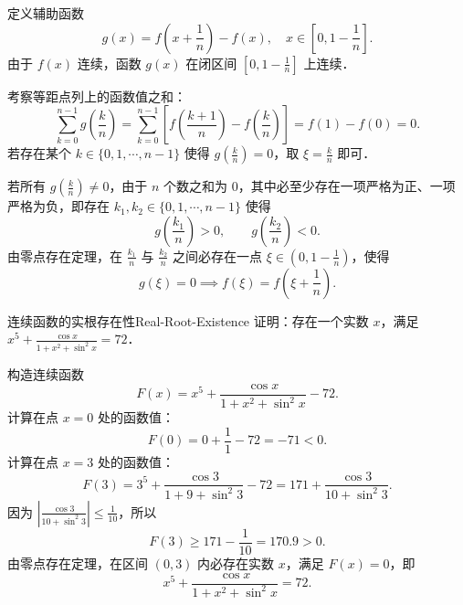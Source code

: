\begin{myproof}
    定义辅助函数
    \begin{equation}
        g(x) = f\left( x + \frac{1}{n} \right) - f(x), \quad x \in \left[ 0, 1 - \frac{1}{n} \right].
    \end{equation}
    由于 $f(x)$ 连续，函数 $g(x)$ 在闭区间 $\left[ 0, 1 - \frac{1}{n} \right]$ 上连续．

    考察等距点列上的函数值之和：
    \begin{equation}
        \sum_{k=0}^{n-1} g\left( \frac{k}{n} \right) = \sum_{k=0}^{n-1} \left[ f\left( \frac{k+1}{n} \right) - f\left( \frac{k}{n} \right) \right] = f(1) - f(0) = 0.
    \end{equation}
    若存在某个 $k \in \{0, 1, \cdots, n-1\}$ 使得 $g\left(\frac{k}{n}\right) = 0$，取 $\xi = \frac{k}{n}$ 即可．

    若所有 $g\left(\frac{k}{n}\right) \neq 0$，由于 $n$ 个数之和为 $0$，其中必至少存在一项严格为正、一项严格为负，即存在 $k_1, k_2 \in \{0, 1, \cdots, n-1\}$ 使得
    \begin{equation}
        g\left( \frac{k_1}{n} \right) > 0, \qquad g\left( \frac{k_2}{n} \right) < 0.
    \end{equation}
    由零点存在定理，在 $\frac{k_1}{n}$ 与 $\frac{k_2}{n}$ 之间必存在一点 $\xi \in \left(0, 1 - \frac{1}{n}\right)$，使得
    \begin{equation}
        g(\xi) = 0 \implies f(\xi) = f\left( \xi + \frac{1}{n} \right).
    \end{equation}
\end{myproof}

\begin{problem}{连续函数的实根存在性}{Real-Root-Existence}
    证明：存在一个实数 $x$，满足 $x^5 + \frac{\cos x}{1 + x^2 + \sin^2 x} = 72$．
\end{problem}

\begin{myproof}
    构造连续函数
    \begin{equation}
        F(x) = x^5 + \frac{\cos x}{1 + x^2 + \sin^2 x} - 72.
    \end{equation}
    计算在点 $x = 0$ 处的函数值：
    \begin{equation}
        F(0) = 0 + \frac{1}{1} - 72 = -71 < 0.
    \end{equation}
    计算在点 $x = 3$ 处的函数值：
    \begin{equation}
        F(3) = 3^5 + \frac{\cos 3}{1 + 9 + \sin^2 3} - 72 = 171 + \frac{\cos 3}{10 + \sin^2 3}.
    \end{equation}
    因为 $\left| \frac{\cos 3}{10 + \sin^2 3} \right| \leqslant \frac{1}{10}$，所以
    \begin{equation}
        F(3) \geqslant 171 - \frac{1}{10} = 170.9 > 0.
    \end{equation}
    由零点存在定理，在区间 $(0, 3)$ 内必存在实数 $x$，满足 $F(x) = 0$，即
    \begin{equation}
        x^5 + \frac{\cos x}{1 + x^2 + \sin^2 x} = 72.
    \end{equation}
\end{myproof}

